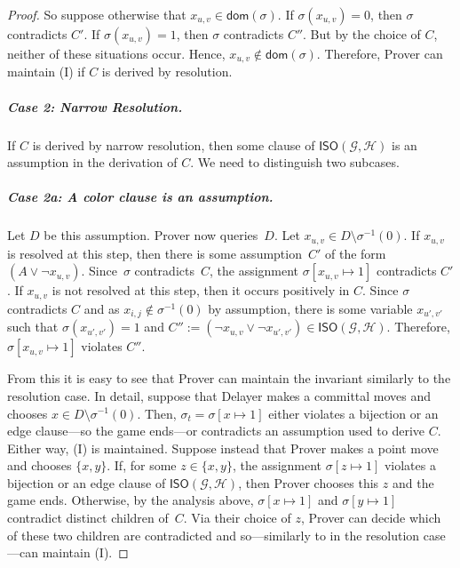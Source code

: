 \documentclass[10pt,a4paper]{article}
\newcommand{\graphG}{\mathcal{G}}
\newcommand{\graphH}{\mathcal{H}}
\newcommand{\dom}{\mathsf{dom}}
\newcommand{\ISO}{\mathsf{ISO}(\graphG, \graphH)}
\begin{document}
\begin{proof}
So suppose otherwise that $x_{u,v} \in \dom(\sigma)$. If $\sigma(x_{u,v}) = 0$, then $\sigma$ contradicts $C'$.
If $\sigma(x_{u,v}) = 1$, then $\sigma$ contradicts $C''$. But by the choice of $C$, neither of these situations occur.
Hence, $x_{u,v} \not \in \dom(\sigma)$. Therefore, Prover can maintain (I) if $C$ is derived by resolution.

\subparagraph{Case 2: Narrow Resolution.} If $C$ is derived by narrow resolution, then some clause of $\ISO$ is an assumption in the derivation of $C$. We need to distinguish two subcases.

\subparagraph{Case 2a: A color clause is an assumption.} Let $D$ be this assumption. Prover now queries~$D$. Let $x_{u,v} \in D \setminus \sigma^{-1}(0) $. If $x_{u,v}$ is resolved at this step, then there is some assumption~$C'$ of the form $(A \vee \neg x_{u,v})$. Since~$\sigma$ contradicts~$C$, the assignment $\sigma[x_{u,v} \mapsto 1]$ contradicts $C'$. If $x_{u,v}$ is not resolved at this step, then it occurs positively in $C$. Since $\sigma$ contradicts $C$ and as $x_{i,j} \not \in \sigma^{-1}(0)$ by assumption, there is some variable $x_{u', v'}$ such that $\sigma(x_{u', v'}) = 1$ and $C'' :=(\neg x_{u,v} \vee \neg x_{u', v'}) \in \ISO$. Therefore, $\sigma[x_{u,v} \mapsto 1]$ violates $C''$. 

From this it is easy to see that Prover can maintain the invariant similarly to the resolution case. In detail, suppose that Delayer makes a committal moves and chooses $x \in D \setminus \sigma^{-1}(0)$. Then,
$\sigma_{t} = \sigma[x \mapsto 1]$ either violates a bijection or an edge clause---so the game ends---or contradicts an assumption used to derive $C$. Either way, (I) is maintained. Suppose instead that Prover makes a point move and chooses $\{x,y\}$.
If, for some $z \in \{x,y\}$, the assignment $\sigma[z\mapsto1]$ violates a bijection or an edge clause of $\ISO$, then Prover chooses this $z$ and the game ends.
Otherwise, by the analysis above, $\sigma[x\mapsto1]$ and $\sigma[y\mapsto1]$ contradict distinct children of~$C$. Via their choice of $z$, Prover can decide which of these two children are contradicted and so---similarly to in the resolution case---can maintain (I). 


\end{proof}
\end{document}
